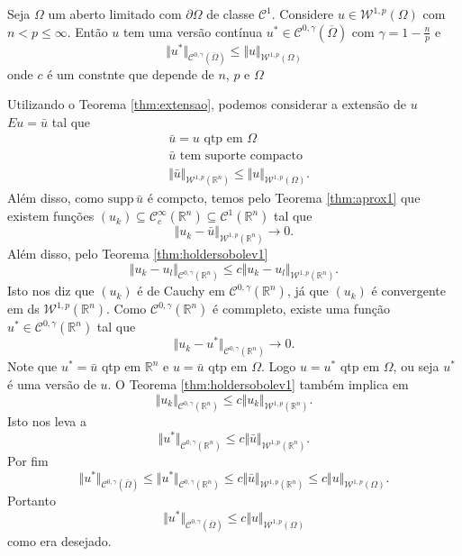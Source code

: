 \documentclass[a4paper, 11pt]{book}
\theoremstyle{definition}
\newcommand{\bR}{\mathbb{R}}
\newcommand{\cC}{\mathcal{C}}
\newcommand{\cW}{\mathcal{W}}
\newcommand{\supp}{\mathrm{supp}\,}
\begin{document}
\begin{tbox}
    Seja $\Omega$ um aberto limitado com $\partial\Omega$ de classe $\cC^1$.
    Considere $u \in \cW^{1,p}(\Omega)$ com $n < p \leqslant \infty$.
    Então $u$ tem uma versão contínua $u^* \in \cC^{0,\gamma}(\overline\Omega)$ com $\gamma = 1 - \frac{n}{p}$ e
    \[
        \Vert u^*  \Vert_{\cC^{0,\gamma}(\overline\Omega)} \leqslant \Vert u \Vert_{\cW^{1,p}(\Omega)}
    \]
    onde $c$ é um constnte que depende de $n$, $p$ e $\Omega$
\end{tbox}
\begin{prf}
    Utilizando o Teorema \ref{thm:extensao}, podemos considerar a extensão de $u$ $Eu = \bar u$ tal que
    \[
        \begin{aligned}
            &\bar u = u \text{ qtp em } \Omega\\
            &\bar u \text{ tem suporte compacto}\\
            &\Vert \bar u \Vert_{\cW^{1,p}(\bR^n)} \leqslant \Vert u \Vert_{\cW^{1,p}(\Omega)}.
        \end{aligned}
    \]
    Além disso, como $\supp \bar u$ é compcto, temos pelo Teorema \ref{thm:aprox1} que existem funções $(u_k) \subseteq \cC^\infty_c(\bR^n) \subseteq \cC^1(\bR^n)$ tal que
    \[
        \Vert u_k - \bar u \Vert_{\cW^{1,p}(\bR^n)} \to 0.
    \]
    Além disso, pelo Teorema \ref{thm:holdersobolev1}
    \[
        \Vert u_k -u_l \Vert_{\cC^{0,\gamma}(\bR^n)} \leqslant c \Vert u_k - u_l \Vert_{\cW^{1,p}(\bR^n)}.
    \]
    Isto nos diz que $(u_k)$ é de Cauchy em $\cC^{0,\gamma}(\bR^n)$, já que $(u_k)$ é convergente em ds $\cW^{1,p}(\bR^n)$.
    Como $\cC^{0,\gamma}(\bR^n)$ é commpleto, existe uma função $u^* \in \cC^{0,\gamma}(\bR^n)$ tal que
    \[
        \Vert u_k - u^* \Vert_{\cC^{0,\gamma}(\bR^n)} \to 0.
    \]
    Note que $u^* = \bar u$ qtp em $\bR^n$ e $u = \bar u$ qtp em $\Omega$.
    Logo $u = u^*$ qtp em $\Omega$, ou seja $u^*$ é uma versão de $u$.
    O Teorema \ref{thm:holdersobolev1} também implica em
    \[
        \Vert u_k \Vert_{\cC^{0,\gamma}(\bR^n)} \leqslant c \Vert u_k \Vert_{\cW^{1,p}(\bR^n)}.
    \]
    Isto nos leva a
    \[
        \Vert u^* \Vert_{\cC^{0,\gamma}(\bR^n)} \leqslant c \Vert \bar u \Vert_{\cW^{1,p}(\bR^n)}.
    \]
    Por fim
    \[
        \Vert u^* \Vert_{\cC^{0,\gamma}(\overline \Omega)} \leqslant \Vert u^* \Vert_{\cC^{0,\gamma}(\bR^n)} \leqslant c \Vert \bar u \Vert_{\cW^{1,p}(\bR^n)} \leqslant c \Vert u \Vert_{\cW^{1,p}(\Omega)}.
    \]
    Portanto
    \[
        \Vert u^* \Vert_{\cC^{0,\gamma}(\overline\Omega)} \leqslant c \Vert u \Vert_{\cW^{1,p}(\Omega)}
    \]
    como era desejado.
\end{prf}
\end{document}
